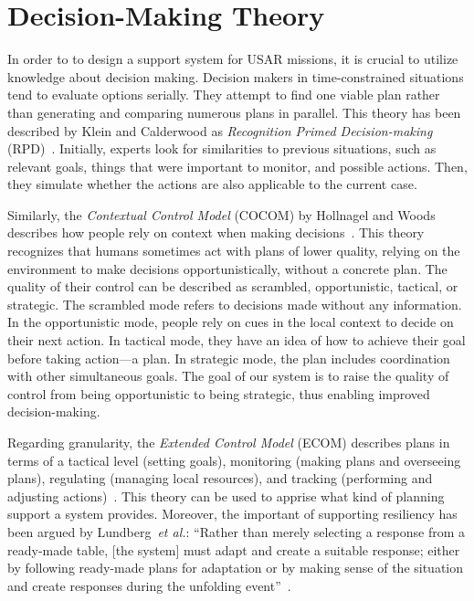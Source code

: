 \documentclass[conference,10pt,letter]{IEEEtran}
\def\etal{\textit{et al.}}
\begin{document}

\section{Decision-Making Theory} \label{sec:theory}
In order to to design a support system for USAR missions, it is crucial to utilize knowledge about decision making. Decision makers in time-constrained situations tend to evaluate options serially. They attempt to find one viable plan rather than generating and comparing numerous plans in parallel. This theory has been described by Klein and Calderwood as \emph{Recognition Primed Decision-making} (RPD)~\cite{KleinCalderwood}. Initially, experts look for similarities to previous situations, such as relevant goals, things that were important to monitor, and possible actions. Then, they simulate whether the actions are also applicable to the current case.

Similarly, the \emph{Contextual Control Model} (COCOM) by Hollnagel and Woods describes how people rely on context when making decisions~\cite{hollnagel2005joint}. This theory recognizes that humans sometimes act with plans of lower quality, relying on the environment to make decisions opportunistically, without a concrete plan. The quality of their control can be described as scrambled, opportunistic, tactical, or strategic. The scrambled mode refers to decisions made without any information. In the opportunistic mode, people rely on cues in the local context to decide on their next action. In tactical mode, they have an idea of how to achieve their goal before taking action---a plan. In strategic mode, the plan includes coordination with other simultaneous goals. The goal of our system is to raise the quality of control from being opportunistic to being strategic, thus enabling improved decision-making.

Regarding granularity, the \emph{Extended Control Model} (ECOM) describes plans in terms of a tactical level (setting goals), monitoring (making plans and overseeing plans), regulating (managing local resources), and tracking (performing and adjusting actions)~\cite{hollnagel2005joint}. This theory can be used to apprise what kind of planning support a system provides. Moreover, the important of supporting resiliency has been argued by Lundberg~\etal : ``Rather than merely selecting a response from a ready-made table, [the system] must adapt and create a suitable response; either by following ready-made plans for adaptation or by making sense of the situation and create responses during the unfolding event''~\cite{Lundberg2012}.
\end{document}
